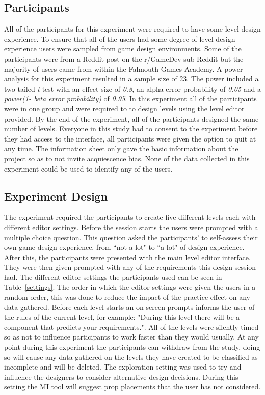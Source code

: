 \documentclass[journal]{IEEEtran}
\begin{document}
\subsection{Participants}
All of the participants for this experiment were required to have some level design experience. To ensure that all of the users had some degree of level design experience users were sampled from game design environments.  Some of the participants were from a Reddit post on the r/GameDev sub Reddit but the majority of users came from within the Falmouth Games Academy.   
A power analysis for this experiment resulted in a sample size of 23. The power included a two-tailed \textit{t}-test with an effect size of \textit{0.8}, an alpha error probability of \textit{0.05} and a \textit{power(1- beta error probability)} of \textit{0.95}. In this experiment all of the participants were in one group and were required to to design levels using the level editor provided. By the end of the experiment, all of the participants designed the same number of levels. Everyone in this study had to consent to the experiment before they had access to the interface, all participants were given the option to quit at any time. The information sheet only gave the basic information about the project so as to not invite acquiescence bias\cite{watson1992correcting}. None of the data collected in this experiment could be used to identify any of the users.

\subsection{Experiment Design}
The experiment required the participants to create five different levels each with different editor settings. Before the session starts the users were prompted with a multiple choice question. This question asked the participants' to self-assess their own game design experience, from ``not a lot" to ``a lot" of design experience. After this, the participants were presented with the main level editor interface. They were then given prompted with any of the requirements this design session had. The different editor settings the participants used can be seen in Table~\ref{settings}. The order in which the editor settings were given the users in a random order, this was done to reduce the impact of the practice effect on any data gathered. Before each level starts an on-screen prompts informs the user of the rules of the current level, for example: "During this level there will be a component that predicts your requirements.". All of the levels were silently timed so as not to influence participants to work faster than they would usually. At any point during this experiment the participants can withdraw from the study, doing so will cause any data gathered on the levels they have created to be classified as incomplete and will be deleted. The exploration setting was used to try and influence the designers to consider alternative design decisions. During this setting the MI tool will suggest prop placements that the user has not considered. 
\end{document}
